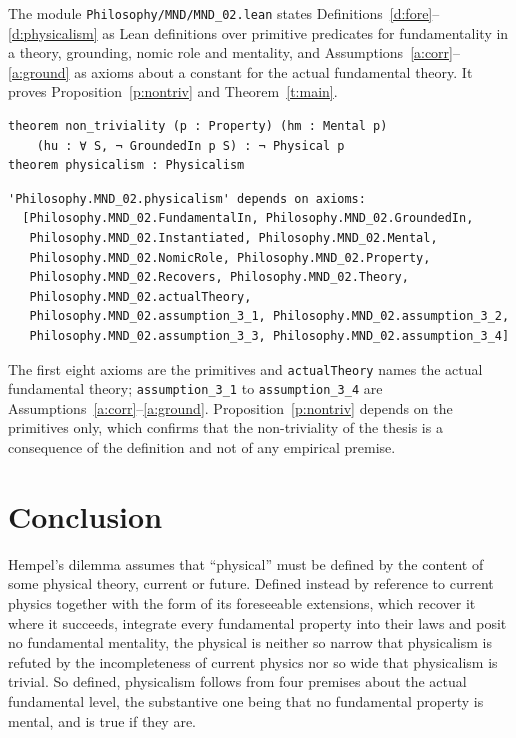 \documentclass{situationist-preprint}
\begin{document}
The module \nolinkurl{Philosophy/MND/MND_02.lean} states Definitions~\ref{d:fore}--\ref{d:physicalism} as Lean definitions over primitive predicates for fundamentality in a theory, grounding, nomic role and mentality, and Assumptions~\ref{a:corr}--\ref{a:ground} as axioms about a constant for the actual fundamental theory. It proves Proposition~\ref{p:nontriv} and Theorem~\ref{t:main}.

\begin{lstlisting}
theorem non_triviality (p : Property) (hm : Mental p)
    (hu : ∀ S, ¬ GroundedIn p S) : ¬ Physical p
theorem physicalism : Physicalism
\end{lstlisting}

\begin{lstlisting}
'Philosophy.MND_02.physicalism' depends on axioms:
  [Philosophy.MND_02.FundamentalIn, Philosophy.MND_02.GroundedIn,
   Philosophy.MND_02.Instantiated, Philosophy.MND_02.Mental,
   Philosophy.MND_02.NomicRole, Philosophy.MND_02.Property,
   Philosophy.MND_02.Recovers, Philosophy.MND_02.Theory,
   Philosophy.MND_02.actualTheory,
   Philosophy.MND_02.assumption_3_1, Philosophy.MND_02.assumption_3_2,
   Philosophy.MND_02.assumption_3_3, Philosophy.MND_02.assumption_3_4]
\end{lstlisting}

The first eight axioms are the primitives and \texttt{actualTheory} names the actual fundamental theory; \texttt{assumption\_3\_1} to \texttt{assumption\_3\_4} are Assumptions~\ref{a:corr}--\ref{a:ground}. Proposition~\ref{p:nontriv} depends on the primitives only, which confirms that the non-triviality of the thesis is a consequence of the definition and not of any empirical premise.

\section{Conclusion}

Hempel's dilemma assumes that \enquote{physical} must be defined by the content of some physical theory, current or future. Defined instead by reference to current physics together with the form of its foreseeable extensions, which recover it where it succeeds, integrate every fundamental property into their laws and posit no fundamental mentality, the physical is neither so narrow that physicalism is refuted by the incompleteness of current physics nor so wide that physicalism is trivial. So defined, physicalism follows from four premises about the actual fundamental level, the substantive one being that no fundamental property is mental, and is true if they are.
\end{document}
